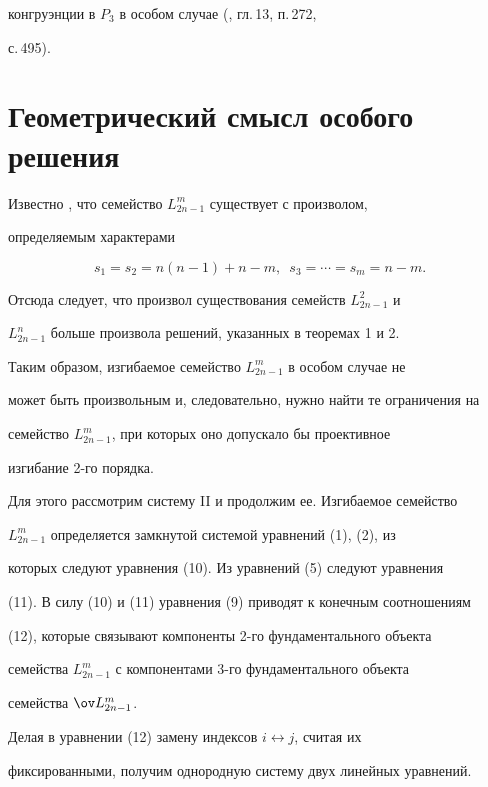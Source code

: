 конгруэнции в $P_3$ в особом случае (\cite{4}, гл.\,13, п.\,272, 


с.\,495). 


 


\section{Геометрический смысл особого решения} 


 


Известно \cite{5}, что семейство $L^m_{2n-1}$ существует с произволом, 


определяемым характерами 


$$ 


s_1=s_2=n(n-1)+n-m,\ \; s_3=\dotsb=s_m=n-m. 


$$ 


Отсюда следует, что произвол существования семейств $L^2_{2n-1}$ и 


$L^n_{2n-1}$ больше произвола решений, указанных в теоремах 1 и 2. 


Таким образом, изгибаемое семейство $L^m_{2n-1}$ в особом случае не 


может быть произвольным и, следовательно, нужно найти те ограничения на 


семейство $L^m_{2n-1}$, при которых оно допускало бы проективное 


изгибание 2-го порядка. 


 


Для этого рассмотрим систему II и продолжим ее. Изгибаемое семейство 


$L^m_{2n-1}$ определяется замкнутой системой уравнений (1), (2), из 


которых следуют уравнения (10). Из уравнений (5) следуют уравнения 


(11). В силу (10) и (11) уравнения (9) приводят к конечным соотношениям 


(12), которые связывают компоненты 2-го фундаментального объекта 


семейства $L^m_{2n-1}$ с компонентами 3-го фундаментального объекта 


семейства $\ov L^m_{2n-1}$. 


 


Делая в уравнении (12) замену индексов $i\leftrightarrow j$, считая их 


фиксированными, получим однородную систему двух линейных уравнений. 


